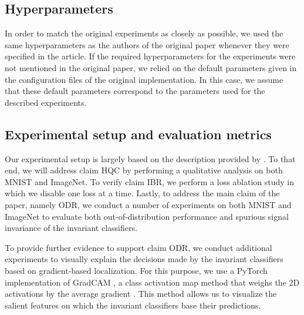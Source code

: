 
\subsection{Hyperparameters}
In order to match the original experiments as closely as possible, we used the same hyperparameters as the authors of the original paper whenever they were specified in the article. If the required hyperparameters for the experiments were not mentioned in the original paper, we relied on the default parameters given in the configuration files of the original implementation. In this case, we assume that these default parameters correspond to the parameters used for the described experiments.

\subsection{Experimental setup and evaluation metrics}
\label{subsec:expt}
Our experimental setup is largely based on the description provided by \citet{Sauer2021ICLR}. To that end, we will address claim HQC by performing a qualitative analysis on both MNIST and ImageNet. 
To verify claim IBR, we perform a loss ablation study in which we disable one loss at a time. Lastly, to address the main claim of the paper, namely ODR, we conduct a number of experiments on both MNIST and ImageNet to evaluate both out-of-distribution performance and spurious signal invariance of the invariant classifiers. 

To provide further evidence to support claim ODR, we conduct additional experiments to visually explain the decisions made by the invariant classifiers based on gradient-based localization. For this purpose, we use a PyTorch implementation of GradCAM \cite{torchcam, gradcam}, a class activation map method that weighs the 2D activations by the average gradient \cite{gradcam}. This method allows us to visualize the salient features on which the invariant classifiers base their predictions.


